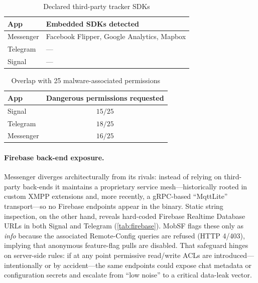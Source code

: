 \documentclass[a4paper,12pt]{report}
\begin{document}
\begin{table}[htbp]
  \centering
  \caption{Declared third-party tracker SDKs}
  \label{tab:trackers}
  \begin{tabular}{|l|p{7cm}|}
    \hline
    \textbf{App} & \textbf{Embedded SDKs detected} \\ \hline
    Messenger & Facebook Flipper, Google Analytics, Mapbox \\ \hline
    Telegram  & — \\ \hline
    Signal    & — \\ \hline
  \end{tabular}
\end{table}

\begin{table}[htbp]
  \centering
  \caption{Overlap with 25 malware-associated permissions}
  \label{tab:perm-malware}
  \begin{tabular}{|l|c|}
    \hline
    \textbf{App} & \textbf{Dangerous permissions requested} \\ \hline
    Signal    & \(15 / 25\) \\ \hline
    Telegram  & \(18 / 25\) \\ \hline
    Messenger & \(16 / 25\) \\ \hline
  \end{tabular}
\end{table}

\paragraph{Firebase back-end exposure.}

Messenger diverges architecturally from its rivals: instead of relying on third-party back-ends it maintains a proprietary service mesh—historically rooted in custom XMPP extensions and, more recently, a gRPC-based “MqttLite” transport—so no Firebase endpoints appear in the binary.
Static string inspection, on the other hand, reveals hard-coded Firebase Realtime Database URLs in both Signal and Telegram (\autoref{tab:firebase}). MobSF flags these only as \textit{info} because the associated Remote-Config queries are refused (HTTP 4/403), implying that anonymous feature-flag pulls are disabled. That safeguard hinges on server-side rules: if at any point permissive read/write ACLs are introduced—intentionally or by accident—the same endpoints could expose chat metadata or configuration secrets and escalate from “low noise” to a critical data-leak vector.
\end{document}
